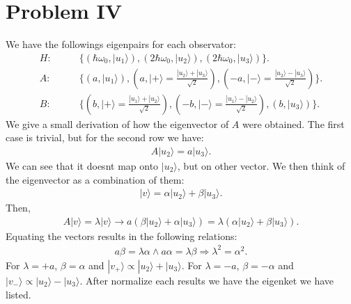 \documentclass[letterpaper,11pt,twoside]{article}
\newcommand{\ket}[1]{|#1\rangle}
\begin{document}
\section*{Problem IV}
We have the followings eigenpairs for each observator:
\begin{align*}
  H:\qquad&\{(\hbar\omega_0,\ket{u_1}),(2\hbar\omega_0,\ket{u_2}),(2\hbar\omega_0,\ket{u_3})\}.\\
  A:\qquad&\{(a,\ket{u_1}),(a,\ket{+}=\frac{\ket{u_2}+\ket{u_3}}{\sqrt{2}}),(-a,\ket{-}=\frac{\ket{u_2}-\ket{u_3}}{\sqrt{2}})\}.\\
  B:\qquad&\{(b,\ket{+}=\frac{\ket{u_1}+\ket{u_2}}{\sqrt{2}}),(-b,\ket{-}=\frac{\ket{u_1}-\ket{u_2}}{\sqrt{2}}),(b,\ket{u_3})\}.
\end{align*}
We give a small derivation of how the eigenvector of $A$ were obtained. The first case is trivial, but for the second row we have:
\begin{align*}
  A\ket{u_2}=a\ket{u_3}.
\end{align*}
We can see that it doesnt map onto $\ket{u_2}$, but on other vector. We then think of the eigenvector as a combination of them:
\begin{align*}
  \ket{v}=\alpha\ket{u_2}+\beta\ket{u_3}.
\end{align*}
Then,
\begin{align*}
  A\ket{v}=\lambda\ket{v}\longrightarrow a(\beta\ket{u_2}+\alpha\ket{u_3})=\lambda(\alpha\ket{u_2}+\beta\ket{u_3}).
\end{align*}
Equating the vectors results in the following relations:
\begin{align*}
  a\beta=\lambda\alpha\land a\alpha=\lambda\beta\Longrightarrow\lambda^2=\alpha^2.
\end{align*}
For $\lambda=+a$, $\beta=\alpha$ and $\ket{v_+}\propto\ket{u_2}+\ket{u_3}$. For $\lambda=-a$, $\beta=-\alpha$ and $\ket{v_-}\propto\ket{u_2}-\ket{u_3}$. After normalize each 
results we have the eigenket we have listed.
\end{document}
